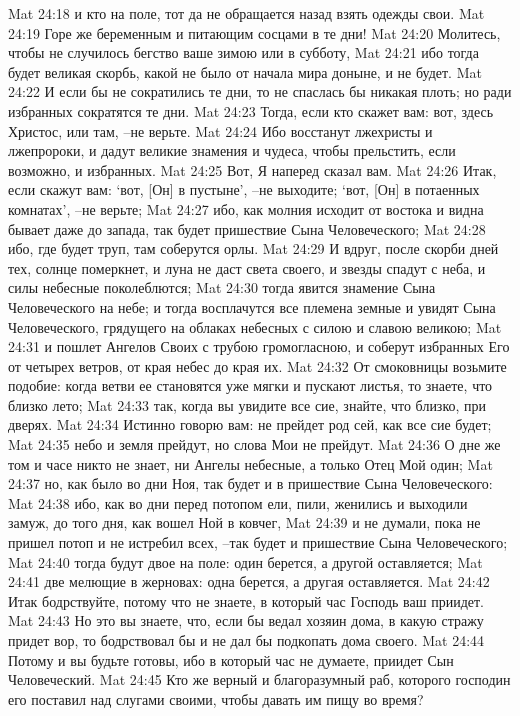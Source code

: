 Mat 24:18  и кто на поле, тот да не обращается назад взять одежды свои.
Mat 24:19  Горе же беременным и питающим сосцами в те дни!
Mat 24:20  Молитесь, чтобы не случилось бегство ваше зимою или в субботу,
Mat 24:21  ибо тогда будет великая скорбь, какой не было от начала мира доныне, и не будет.
Mat 24:22  И если бы не сократились те дни, то не спаслась бы никакая плоть; но ради избранных сократятся те дни.
Mat 24:23  Тогда, если кто скажет вам: вот, здесь Христос, или там, --не верьте.
Mat 24:24  Ибо восстанут лжехристы и лжепророки, и дадут великие знамения и чудеса, чтобы прельстить, если возможно, и избранных.
Mat 24:25  Вот, Я наперед сказал вам.
Mat 24:26  Итак, если скажут вам: `вот, [Он] в пустыне', --не выходите; `вот, [Он] в потаенных комнатах', --не верьте;
Mat 24:27  ибо, как молния исходит от востока и видна бывает даже до запада, так будет пришествие Сына Человеческого;
Mat 24:28  ибо, где будет труп, там соберутся орлы.
Mat 24:29  И вдруг, после скорби дней тех, солнце померкнет, и луна не даст света своего, и звезды спадут с неба, и силы небесные поколеблются;
Mat 24:30  тогда явится знамение Сына Человеческого на небе; и тогда восплачутся все племена земные и увидят Сына Человеческого, грядущего на облаках небесных с силою и славою великою;
Mat 24:31  и пошлет Ангелов Своих с трубою громогласною, и соберут избранных Его от четырех ветров, от края небес до края их.
Mat 24:32  От смоковницы возьмите подобие: когда ветви ее становятся уже мягки и пускают листья, то знаете, что близко лето;
Mat 24:33  так, когда вы увидите все сие, знайте, что близко, при дверях.
Mat 24:34  Истинно говорю вам: не прейдет род сей, как все сие будет;
Mat 24:35  небо и земля прейдут, но слова Мои не прейдут.
Mat 24:36  О дне же том и часе никто не знает, ни Ангелы небесные, а только Отец Мой один;
Mat 24:37  но, как было во дни Ноя, так будет и в пришествие Сына Человеческого:
Mat 24:38  ибо, как во дни перед потопом ели, пили, женились и выходили замуж, до того дня, как вошел Ной в ковчег,
Mat 24:39  и не думали, пока не пришел потоп и не истребил всех, --так будет и пришествие Сына Человеческого;
Mat 24:40  тогда будут двое на поле: один берется, а другой оставляется;
Mat 24:41  две мелющие в жерновах: одна берется, а другая оставляется.
Mat 24:42  Итак бодрствуйте, потому что не знаете, в который час Господь ваш приидет.
Mat 24:43  Но это вы знаете, что, если бы ведал хозяин дома, в какую стражу придет вор, то бодрствовал бы и не дал бы подкопать дома своего.
Mat 24:44  Потому и вы будьте готовы, ибо в который час не думаете, приидет Сын Человеческий.
Mat 24:45  Кто же верный и благоразумный раб, которого господин его поставил над слугами своими, чтобы давать им пищу во время?

